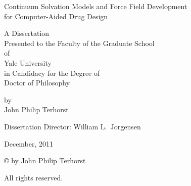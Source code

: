 \documentclass[12pt]{report}
\begin{document}
\begin{center}
\begin{singlespace}

\vspace*{3cm}

              Continuum Solvation Models and Force Field Development \\
                        for Computer-Aided Drug Design

\vspace*{5cm}

                              A Dissertation \\
              Presented to the Faculty of the Graduate School \\
                                    of \\
                             Yale University \\
                      in Candidacy for the Degree of \\
                           Doctor of Philosophy

\vspace*{5cm}

                                     by \\
                            John Philip Terhorst 

\bigskip

                  Dissertation Director: William L.\ Jorgensen

\bigskip               
                               December, 2011

\end{singlespace}
\newpage



\vspace*{4cm}

              \copyright {} by John Philip Terhorst

                            All rights reserved.
\end{center}
\newpage

\end{document}
